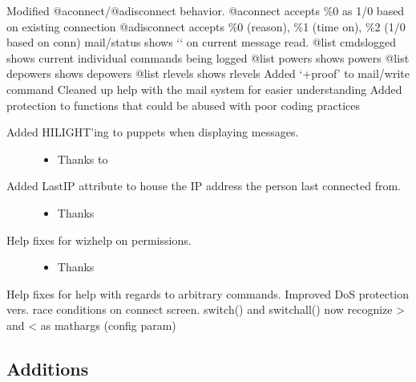 \documentclass[letterpaper,10pt,english]{sphinxmanual}
\begin{document}
\sphinxAtStartPar
Modified @aconnect/@adisconnect behavior.
@aconnect accepts \%0 as 1/0 based on existing connection
@adisconnect accepts \%0 (reason), \%1 (time on), \%2 (1/0 based on conn)
mail/status shows ‘\sphinxhyphen{}‘ on current message read.
@list cmdslogged \sphinxhyphen{} shows current individual commands being logged
@list powers \sphinxhyphen{} shows powers
@list depowers \sphinxhyphen{} shows depowers
@list rlevels \sphinxhyphen{} shows rlevels
Added ‘+proof’ to mail/write command
Cleaned up help with the mail system for easier understanding
Added protection to functions that could be abused with poor coding practices
\begin{description}
\item[{Added HILIGHT’ing to puppets when displaying messages.}] \leavevmode\begin{itemize}
\item {} 
\sphinxAtStartPar
Thanks to 

\end{itemize}

\item[{Added LastIP attribute to house the IP address the person last connected from.}] \leavevmode\begin{itemize}
\item {} 
\sphinxAtStartPar
Thanks 

\end{itemize}

\item[{Help fixes for wizhelp on permissions.}] \leavevmode\begin{itemize}
\item {} 
\sphinxAtStartPar
Thanks 

\end{itemize}

\end{description}

\sphinxAtStartPar
Help fixes for help with regards to arbitrary commands.
Improved DoS protection vers. race conditions on connect screen.
switch() and switchall() now recognize \textgreater{} and \textless{} as math\sphinxhyphen{}args (config param)


\subsection{Additions}
\label{\detokenize{changelog:id34}}
\end{document}
